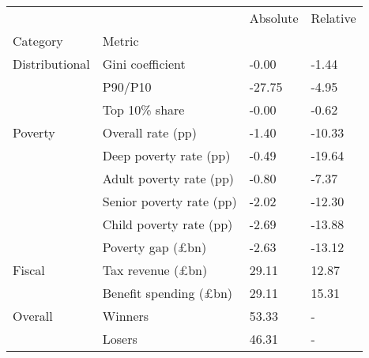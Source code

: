 \begin{tabular}{llll}
\toprule
        &        & Absolute & Relative \\
Category & Metric &          &          \\
\midrule
Distributional & Gini coefficient &    -0.00 &    -1.44 \\
        & P90/P10 &   -27.75 &    -4.95 \\
        & Top 10\% share &    -0.00 &    -0.62 \\
Poverty & Overall rate (pp) &    -1.40 &   -10.33 \\
        & Deep poverty rate (pp) &    -0.49 &   -19.64 \\
        & Adult poverty rate (pp) &    -0.80 &    -7.37 \\
        & Senior poverty rate (pp) &    -2.02 &   -12.30 \\
        & Child poverty rate (pp) &    -2.69 &   -13.88 \\
        & Poverty gap (£bn) &    -2.63 &   -13.12 \\
Fiscal & Tax revenue (£bn) &    29.11 &    12.87 \\
        & Benefit spending (£bn) &    29.11 &    15.31 \\
Overall & Winners &    53.33 &        - \\
        & Losers &    46.31 &        - \\
\bottomrule
\end{tabular}
